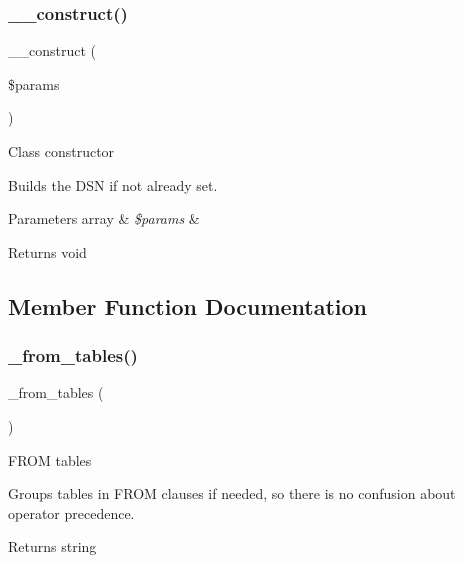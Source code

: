\subsubsection{\texorpdfstring{\+\_\+\+\_\+construct()}{\_\_construct()}}
{\footnotesize\ttfamily \+\_\+\+\_\+construct (\begin{DoxyParamCaption}\item[{}]{\$params }\end{DoxyParamCaption})}

Class constructor

Builds the D\+SN if not already set.


\begin{DoxyParams}[1]{Parameters}
array & {\em \$params} & \\
\hline
\end{DoxyParams}
\begin{DoxyReturn}{Returns}
void 
\end{DoxyReturn}


\subsection{Member Function Documentation}
\mbox{\label{class_c_i___d_b__pdo__mysql__driver_aef43f7e3e7b71d337ff3724c5eb14f10}} 
\subsubsection{\texorpdfstring{\+\_\+from\+\_\+tables()}{\_from\_tables()}}
{\footnotesize\ttfamily \+\_\+from\+\_\+tables (\begin{DoxyParamCaption}{ }\end{DoxyParamCaption})\hspace{0.3cm}{\ttfamily [protected]}}

F\+R\+OM tables

Groups tables in F\+R\+OM clauses if needed, so there is no confusion about operator precedence.

\begin{DoxyReturn}{Returns}
string 
\end{DoxyReturn}
\mbox{\label{class_c_i___d_b__pdo__mysql__driver_a7ccb7f9c301fe7f0a9db701254142b63}} 

